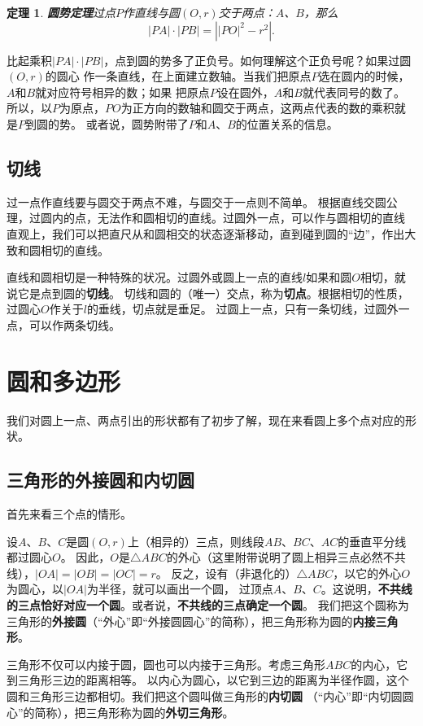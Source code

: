 \documentclass[12pt,UTF8]{ctexbook}
\newtheorem{tm}{定理}[section]
\begin{document}
\begin{tm}\textbf{圆势定理}\label{tm:0-3-40}
    过点$P$作直线与圆$(O, r)$交于两点：$A$、$B$，那么
    $$ |PA| \cdot |PB| = \left||PO|^2 - r^2\right|. $$
\end{tm}

比起乘积$|PA| \cdot |PB|$，点到圆的势多了正负号。如何理解这个正负号呢？如果过圆$(O,r)$的圆心
作一条直线，在上面建立数轴。当我们把原点$P$选在圆内的时候，$A$和$B$就对应符号相异的数；如果
把原点$P$设在圆外，$A$和$B$就代表同号的数了。
所以，以$P$为原点，$PO$为正方向的数轴和圆交于两点，这两点代表的数的乘积就是$P$到圆的势。
或者说，圆势附带了$P$和$A$、$B$的位置关系的信息。

\section{切线}
过一点作直线要与圆交于两点不难，与圆交于一点则不简单。
根据直线交圆公理，过圆内的点，无法作和圆相切的直线。过圆外一点，可以作与圆相切的直线
直观上，我们可以把直尺从和圆相交的状态逐渐移动，直到碰到圆的“边”，作出大致和圆相切的直线。

直线和圆相切是一种特殊的状况。过圆外或圆上一点的直线$l$如果和圆$O$相切，就说它是点到圆的\textbf{切线}。
切线和圆的（唯一）交点，称为\textbf{切点}。根据相切的性质，过圆心$O$作关于$l$的垂线，切点就是垂足。
过圆上一点，只有一条切线，过圆外一点，可以作两条切线。

\chapter{圆和多边形}
我们对圆上一点、两点引出的形状都有了初步了解，现在来看圆上多个点对应的形状。

\section{三角形的外接圆和内切圆}
首先来看三个点的情形。

设$A$、$B$、$C$是圆$(O,r)$上（相异的）三点，则线段$AB$、$BC$、$AC$的垂直平分线都过圆心$O$。
因此，$O$是$\triangle ABC$的外心（这里附带说明了圆上相异三点必然不共线），$|OA|=|OB|=|OC|=r$。
反之，设有（非退化的）$\triangle ABC$，以它的外心$O$为圆心，以$|OA|$为半径，就可以画出一个圆，
过顶点$A$、$B$、$C$。这说明，\textbf{不共线的三点恰好对应一个圆}。或者说，\textbf{不共线的三点确定一个圆}。
我们把这个圆称为三角形的\textbf{外接圆}（“外心”即“外接圆圆心”的简称），把三角形称为圆的\textbf{内接三角形}。

三角形不仅可以内接于圆，圆也可以内接于三角形。考虑三角形$ABC$的内心，它到三角形三边的距离相等。
以内心为圆心，以它到三边的距离为半径作圆，这个圆和三角形三边都相切。我们把这个圆叫做三角形的\textbf{内切圆}
（“内心”即“内切圆圆心”的简称），把三角形称为圆的\textbf{外切三角形}。
\end{document}
